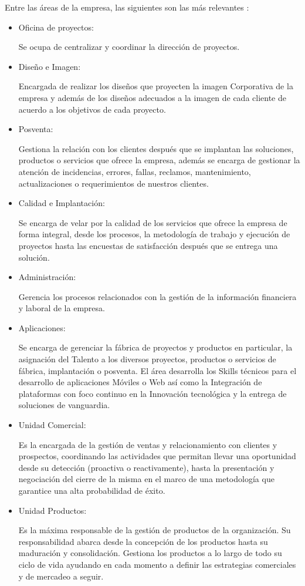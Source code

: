 Entre las áreas de la empresa, las siguientes son las más relevantes \cite{ESGB2}:
\begin{itemize}[noitemsep,nolistsep]
\item {Oficina de proyectos:} 

Se ocupa de centralizar y coordinar la dirección de proyectos. 

\item {Diseño e Imagen:}

Encargada de realizar los diseños que proyecten la imagen Corporativa de la empresa y además de los diseños adecuados a la imagen de cada cliente de acuerdo a los objetivos de cada proyecto. 

\item {Posventa:}

Gestiona la relación con los clientes después que se implantan las soluciones, productos o servicios que ofrece la empresa, además se encarga de gestionar la atención de incidencias, errores, fallas, reclamos, mantenimiento, actualizaciones o requerimientos de nuestros clientes. 
 
\item {Calidad e Implantación:}
 
Se encarga de velar por la calidad de los servicios que ofrece la empresa de forma integral, desde los procesos, la metodología de trabajo y ejecución de proyectos hasta las encuestas de satisfacción después que se entrega una solución.

\item {Administración:}

Gerencia los procesos relacionados con la gestión de la información financiera y laboral de la empresa.

\item {Aplicaciones:}

Se encarga de gerenciar la fábrica de proyectos y productos en particular, la asignación del Talento a los diversos proyectos, productos o servicios de fábrica, implantación o posventa. El área desarrolla los Skills técnicos para el desarrollo de aplicaciones Móviles o Web así como la Integración de plataformas con foco continuo en la Innovación tecnológica y la entrega de soluciones de vanguardia.

\item {Unidad Comercial:}

Es la encargada de la gestión de ventas y relacionamiento con clientes y prospectos, coordinando las actividades que permitan llevar una oportunidad desde su detección (proactiva o reactivamente), hasta la presentación y negociación del cierre de la misma en el marco de una metodología que garantice una alta probabilidad de éxito.  

\item {Unidad Productos:} 

Es la máxima responsable de la gestión de productos de la organización. Su responsabilidad abarca desde la concepción de los productos hasta su maduración y consolidación. Gestiona los productos a lo largo de todo su ciclo de vida ayudando en cada momento a definir las estrategias comerciales y de mercadeo a seguir. 



\end{itemize}
